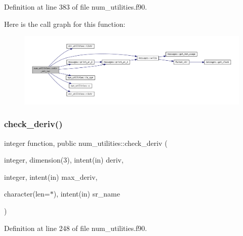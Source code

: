 Definition at line 383 of file num\+\_\+utilities.\+f90.

Here is the call graph for this function\+:
\nopagebreak
\begin{figure}[H]
\begin{center}
\leavevmode
\includegraphics[width=350pt]{namespacenum__utilities_a2d5d9c66db19fb6edeeb50db6182397f_cgraph}
\end{center}
\end{figure}
\mbox{\label{namespacenum__utilities_a00f4cfe18a734eaa5d66f529e52f7c31}} 
\subsubsection{\texorpdfstring{check\+\_\+deriv()}{check\_deriv()}}
{\footnotesize\ttfamily integer function, public num\+\_\+utilities\+::check\+\_\+deriv (\begin{DoxyParamCaption}\item[{integer, dimension(3), intent(in)}]{deriv,  }\item[{integer, intent(in)}]{max\+\_\+deriv,  }\item[{character(len=$\ast$), intent(in)}]{sr\+\_\+name }\end{DoxyParamCaption})}



Definition at line 248 of file num\+\_\+utilities.\+f90.

